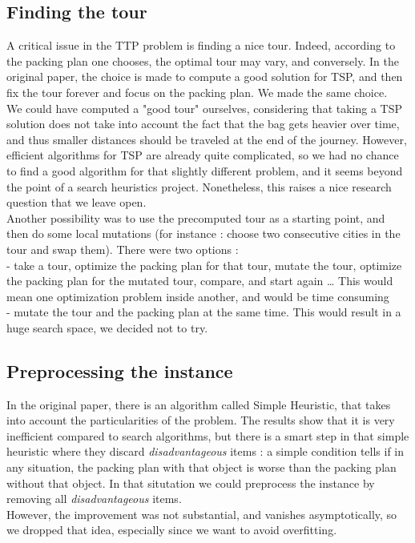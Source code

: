 \documentclass[a4paper]{article}
\begin{document}
\subsection{Finding the tour}
A critical issue in the TTP problem is finding a nice tour. Indeed, according to the packing plan one chooses, the optimal tour may vary, and conversely. In the original paper, the choice is made to compute a good solution for TSP, and then fix the tour forever and focus on the packing plan. We made the same choice.\\
We could have computed a "good tour" ourselves, considering that taking a TSP solution does not take into account the fact that the bag gets heavier over time, and thus smaller distances should be traveled at the end of the journey. However, efficient algorithms for TSP are already quite complicated, so we had no chance to find a good algorithm for that slightly different problem, and it seems beyond the point of a search heuristics project. Nonetheless, this raises a nice research question that we leave open.\\
Another possibility was to use the precomputed tour as a starting point, and then do some local mutations (for instance : choose two consecutive cities in the tour and swap them). There were two options :\\
- take a tour, optimize the packing plan for that tour, mutate the tour, optimize the packing plan for the mutated tour, compare, and start again … This would mean one optimization problem inside another, and would be time consuming\\
- mutate the tour and the packing plan at the same time. This would result in a huge search space, we decided not to try.
\subsection{Preprocessing the instance}
In the original paper, there is an algorithm called Simple Heuristic, that takes into account the particularities of the problem. The results show that it is very inefficient compared to search algorithms, but there is a smart step in that simple heuristic where they discard \textit{disadvantageous} items : a simple condition tells if in any situation, the packing plan with that object is worse than the packing plan without that object. In that situtation we could preprocess the instance by removing all \textit{disadvantageous} items.\\
However, the improvement was not substantial, and vanishes asymptotically, so we dropped that idea, especially since we want to avoid overfitting.
\end{document}
